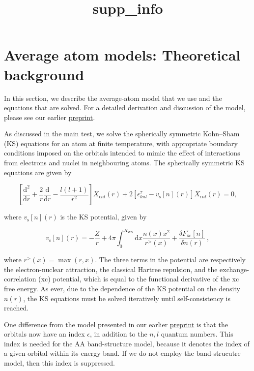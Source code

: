 \documentclass[11pt]{article}
\title{supp\_info}
\begin{document}
    
    \maketitle
    
    

    
    \hypertarget{average-atom-models-theoretical-background}{%
\section{Average atom models: Theoretical
background}\label{average-atom-models-theoretical-background}}

In this section, we describe the average-atom model that we use and the
equations that are solved. For a detailed derivation and discussion of
the model, please see our earlier
\href{https://arxiv.org/abs/2103.09928}{preprint}.

As discussed in the main test, we solve the spherically symmetric
Kohn--Sham (KS) equations for an atom at finite temperature, with
appropriate boundary conditions imposed on the orbitals intended to
mimic the effect of interactions from electrons and nuclei in
neighbouring atoms. The spherically symmetric KS equations are given by

\begin{equation}
\left[\frac{\textrm{d}^2}{\textrm{d}r} + \frac{2}{r}\frac{\textrm{d}}{\textrm{d}r} - \frac{l(l+1)}{r^2} \right] X_{\epsilon nl}(r) + 2 \left[\epsilon^{\tau}_{knl} - v_\textrm{s}[n](r) \right] X_{\epsilon nl}(r) = 0,
\end{equation}

where \(v_\textrm{s}[n](r)\) is the KS potential, given by

\begin{equation}
 v_{\textrm{s}}[n](r) = -\frac{Z}{r} + 4\pi \int_0^{R_\textrm{WS}} \textrm{d}{x} \frac{n(x)x^2}{r^>(x)} + \frac{\delta F_\textrm{xc}^\tau [n]}{\delta n(r)}\,,
\end{equation}

where \(r^>(x)=\max(r,x)\). The three terms in the potential are
respectively the electron-nuclear attraction, the classical Hartree
repulsion, and the exchange-correlation (xc) potential, which is equal
to the functional derivative of the xc free energy. As ever, due to the
dependence of the KS potential on the density \(n(r)\), the KS equations
must be solved iteratively until self-consistency is reached.

One difference from the model presented in our earlier
\href{https://arxiv.org/abs/2103.09928}{preprint} is that the orbitals
now have an index \(\epsilon\), in addition to the \(n,l\) quantum
numbers. This index is needed for the AA band-structure model, because
it denotes the index of a given orbital within its energy band. If we do
not employ the band-strucutre model, then this index is suppressed.
\end{document}
